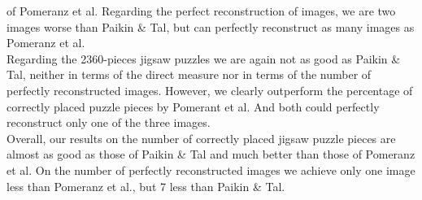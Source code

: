 \documentclass[11pt]{report}
\begin{document}
of Pomeranz et al. Regarding the perfect reconstruction of images, we are two
images worse than Paikin \& Tal, but can perfectly reconstruct as many images as
Pomeranz et al. \\
Regarding the 2360-pieces jigsaw puzzles we are again not as good as Paikin \&
Tal, neither in terms of the direct measure nor in terms of the number of
perfectly reconstructed images. However, we clearly outperform the percentage of
correctly placed puzzle pieces by Pomerant et al. And both could perfectly
reconstruct only one of the three images. \\
Overall, our results on the number of correctly placed jigsaw puzzle pieces are
almost as good as those of Paikin \& Tal and much better than those of Pomeranz
et al. On the number of perfectly reconstructed images we achieve only one image
less than Pomeranz et al., but 7 less than Paikin \& Tal.
\end{document}
